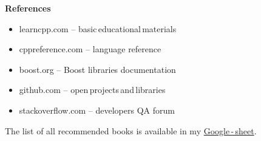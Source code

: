 \documentclass{beamer}
\begin{document}
\begin{frame}{\bf References}

    \begin{itemize}

        \item learncpp.com -- basic\,educational\,materials

        \item cppreference.com -- language reference

        \item boost.org -- Boost libraries documentation

        \item github.com -- open\,projects\,and\,libraries

        \item stackoverflow.com -- developers QA forum

    \end{itemize}

    \begin{block}
    \justifying The list of all recommended books is available in my \href{https://docs.google.com/spreadsheets/d/1MAx4-DoZUrZEB210XJ524e-0OogZRvH7QBorja_tGiw/edit?usp=sharing}{Google\,-\,sheet}.
    \end{block}
    
\end{frame}
\end{document}

